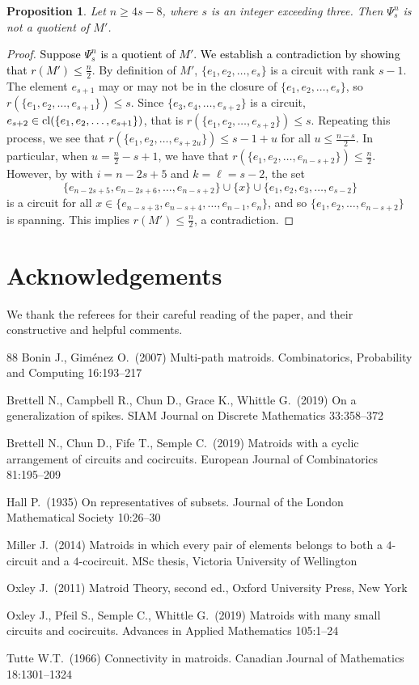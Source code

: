 \documentclass[11pt]{amsart}
\newtheorem{proposition}[theorem]{Proposition}
\newcommand{\cl}{{\rm cl}}
\newcommand{\bloo}{\textcolor{black}}
\begin{document}
\begin{proposition}
Let $n \geq 4s-8$, where $s$ is an integer exceeding three. Then $\Psi^n_s$ is not a quotient of $M'$.
\end{proposition}

\begin{proof}
\bloo{Suppose $\Psi^n_s$ is a quotient of $M'$. We establish a contradiction by showing that $r(M') \leq \frac{n}{2}$}. By definition of $M'$, $\{e_1, e_2, \ldots, e_s\}$ is a circuit with rank $s-1$. The element $e_{s+1}$ may or may not be in the closure of $\{e_1, e_2, \ldots, e_s\}$, so $r(\{e_1, e_2, \ldots, e_{s+1}\}) \leq s$. Since $\{e_3, e_4, \ldots, e_{s+2}\}$ is a circuit, $e_{s+2} \in \cl(\{e_1, e_2, \ldots, e_{s+1}\})$, that is $r(\{e_1, e_2, \ldots, e_{s+2}\}) \leq s$. Repeating this process, we see that $r(\{e_1, e_2, \ldots, e_{s+2u}\}) \leq s-1+u$ for all $u \le \frac{n-s}{2}$. In particular, when $u = \frac{n}{2} - s + 1$, we have that $r(\{e_1, e_2, \ldots, e_{n-s+2}\}) \leq \frac{n}{2}$. However, by  with $i = n-2s+5$ and $k=\ell=s-2$, the set
$$\{e_{n-2s+5}, e_{n-2s+6}, \ldots, e_{n-s+2}\} \cup \{x\} \cup \{e_1, e_2, e_3, \ldots, e_{s-2}\}$$
is a circuit for all $x \in \{e_{n-s+3}, e_{n-s+4}, \ldots, e_{n-1}, e_n\}$, and so $\{e_1,e_2,\ldots,e_{n-s+2}\}$ is spanning. This implies $r(M') \leq \frac{n}{2}$, a contradiction.
\end{proof}

\section*{Acknowledgements}
We thank the referees for their careful reading of the paper, and their constructive and helpful comments.

\begin{thebibliography}{88}
 Bonin J., Gim\'{e}nez O.\ (2007) Multi-path matroids. Combinatorics, Probability and Computing 16:193--217

 Brettell N., Campbell R., Chun D., Grace K., Whittle G.\ (2019) On a generalization of spikes. SIAM Journal on Discrete Mathematics 33:358--372

 Brettell N., Chun D., Fife T., Semple C.\ (2019) Matroids with a cyclic arrangement of circuits and cocircuits. European Journal of Combinatorics 81:195--209

 Hall P.\ (1935) On representatives of subsets. Journal of the London Mathematical Society 10:26--30

 Miller J.\ (2014) Matroids in which every pair of elements belongs to both a $4$-circuit and a $4$-cocircuit. MSc thesis, Victoria University of Wellington

 Oxley J.\ (2011) Matroid Theory, second ed., Oxford University Press, New York

 Oxley J., Pfeil S., Semple C., Whittle G.\ (2019) Matroids with many small circuits and cocircuits. Advances in Applied Mathematics 105:1--24

 Tutte W.T.\ (1966) Connectivity in matroids. Canadian Journal of Mathematics 18:1301--1324
\end{thebibliography}
\end{document}
